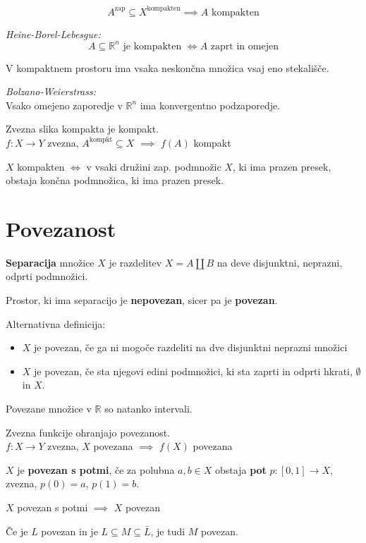 \[ A^{\text{zap}} \subseteq X^{\text{kompakten}} \implies A \text{ kompakten} \]

\emph{Heine-Borel-Lebesgue:}
\[ A \subseteq \mathbb{R}^n \text{ je kompakten } \iff A \text{ zaprt in omejen} \]

V kompaktnem prostoru ima vsaka neskončna množica vsaj eno stekališče.

\emph{Bolzano-Weierstrass:}\\
Vsako omejeno zaporedje v $\mathbb{R}^n$ ima konvergentno podzaporedje.

Zvezna slika kompakta je kompakt.\\
$f: X \to Y$ zvezna, $A^\text{kompkt} \subseteq X$ $\implies$ $f(A)$ kompakt

$X$ kompakten $\iff$ v vsaki družini zap. podmnožic $X$, ki ima prazen presek, obstaja končna podmnožica, ki ima prazen presek.

\section*{Povezanost}
\textbf{Separacija} množice $X$ je razdelitev $X = A \amalg B$ na deve disjunktni, neprazni, odprti podmnožici.

Prostor, ki ima separacijo je \textbf{nepovezan}, sicer pa je \textbf{povezan}.

Alternativna definicija:
\begin{itemize}
	\item $X$ je povezan, če ga ni mogoče razdeliti na dve disjunktni neprazni množici
	\item $X$ je povezan, če sta njegovi edini podmnožici, ki sta zaprti in odprti hkrati, $\emptyset$ in $X$.
\end{itemize}

Povezane množice v $\mathbb{R}$ so natanko intervali.

Zvezna funkcije ohranjajo povezanost.\\
$f: X \to Y$ zvezna, $X$ povezana $\implies$ $f(X)$ povezana

$X$ je \textbf{povezan s potmi}, če za polubna $a,b \in X$ obstaja \textbf{pot} $p: [0,1] \to X$, zvezna, $p(0) = a$, $p(1) = b$.

$X$ povezan s potmi $\implies$ $X$ povezan

Če je $L$ povezan in je $L \subseteq M \subseteq \bar{L}$, je tudi $M$ povezan.
